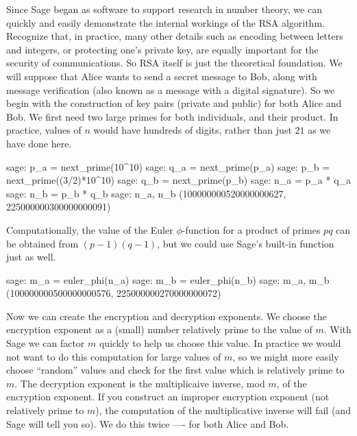 Since Sage began as software to support research in number theory, we can quickly and easily demonstrate the internal workings of the RSA algorithm.  Recognize that, in practice, many other details such as encoding between letters and integers, or protecting one's private key, are equally important for the security of communications.  So RSA itself is just the theoretical foundation.
%
%
We will suppose that Alice wants to send a secret message to Bob, along with message verification (also known as a message with a digital signature).  So we begin with the construction of key pairs (private and public) for both Alice and Bob.  We first need two large primes for both individuals, and their product.  In practice, values of $n$ would have hundreds of digits, rather than just $21$ as we have done here.
%
\begin{sageexample}
sage: p_a = next_prime(10^10)
sage: q_a = next_prime(p_a)
sage: p_b = next_prime((3/2)*10^10)
sage: q_b = next_prime(p_b)
sage: n_a = p_a * q_a
sage: n_b = p_b * q_b
sage: n_a, n_b
(100000000520000000627, 225000000300000000091)
\end{sageexample}
%
Computationally, the value of the Euler $\phi$-function for a product of primes $pq$ can be obtained from $(p-1)(q-1)$, but we could use Sage's built-in function just as well.
%
\begin{sageexample}
sage: m_a = euler_phi(n_a)
sage: m_b = euler_phi(n_b)
sage: m_a, m_b
(100000000500000000576, 225000000270000000072)
\end{sageexample}
%
Now we can create the encryption and decryption exponents.  We choose the encryption exponent as a (small) number relatively prime to the value of $m$.  With Sage we can factor $m$ quickly to help us choose this value.  In practice we would not want to do this computation for large values of $m$, so we might more easily choose ``random'' values and check for the first value which is relatively prime to $m$.  The decryption exponent is the multiplicaive inverse, mod $m$, of the encryption exponent.  If you construct an improper encryption exponent (not relatively prime to $m$), the computation of the multiplicative inverse will fail (and Sage will tell you so).  We do this twice ---- for both Alice and Bob.
